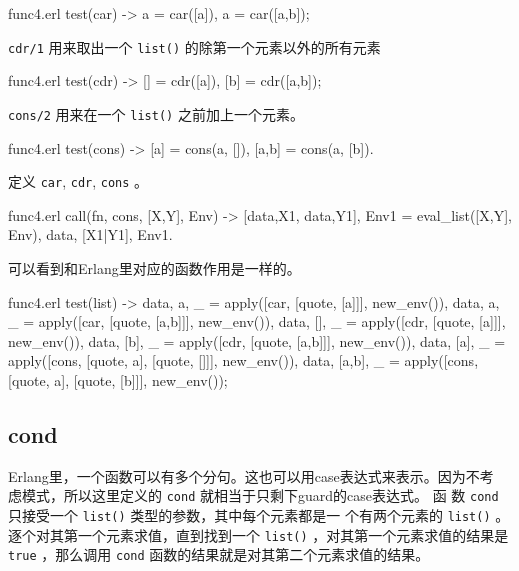 \documentclass[preview,multi,crop=false,border=1in,class=memoir]{standalone}
\begin{document}
\begin{preview-page}
\begin{SourceCode}[96][98]{func4.erl}
test(car) ->
    a = car([a]),
    a = car([a,b]);
\end{SourceCode}

\verb|cdr/1| 用来取出一个 \verb|list()| 的除第一个元素以外的所有元素

\begin{SourceCode}[99][101]{func4.erl}
test(cdr) ->
    [] = cdr([a]),
    [b] = cdr([a,b]);
\end{SourceCode}

\verb|cons/2| 用来在一个 \verb|list()| 之前加上一个元素。

\begin{SourceCode}[102][104]{func4.erl}
test(cons) ->
    [a] = cons(a, []),
    [a,b] = cons(a, [b]).
\end{SourceCode}

定义 \verb|car|, \verb|cdr|, \verb|cons| 。

\begin{SourceCode}[35][38]{func4.erl}
call({fn, cons}, [X,Y], Env) ->
    {[{data,X1}, {data,Y1}], Env1} =
        eval_list([X,Y], Env),
    {{data, [X1|Y1]}, Env1}.
\end{SourceCode}

可以看到和Erlang里对应的函数作用是一样的。

\begin{SourceCode}[81][95]{func4.erl}
test(list) ->
    {{data, a}, _} =
        apply([car, [quote, [a]]], new_env()),
    {{data, a}, _} =
        apply([car, [quote, [a,b]]], new_env()),
    {{data, []}, _} =
        apply([cdr, [quote, [a]]], new_env()),
    {{data, [b]}, _} =
        apply([cdr, [quote, [a,b]]], new_env()),
    {{data, [a]}, _} =
        apply([cons, [quote, a], [quote, []]],
              new_env()),
    {{data, [a,b]}, _} =
        apply([cons, [quote, a], [quote, [b]]],
              new_env());
\end{SourceCode}

\subsection{cond}

Erlang里，一个函数可以有多个分句。这也可以用case表达式来表示。因为不考
虑模式，所以这里定义的 \verb|cond| 就相当于只剩下guard的case表达式。 函
数 \verb|cond| 只接受一个 \verb|list()| 类型的参数，其中每个元素都是一
个有两个元素的 \verb|list()| 。逐个对其第一个元素求值，直到找到一个
\verb|list()| ，对其第一个元素求值的结果是 \verb|true| ，那么调用
\verb|cond| 函数的结果就是对其第二个元素求值的结果。


\end{preview-page}
\end{document}

